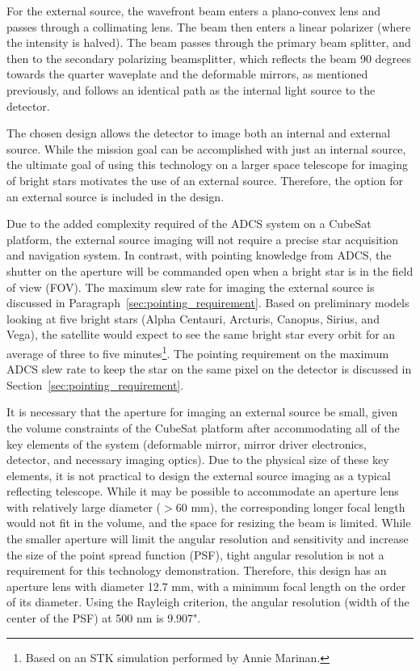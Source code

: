 \documentclass[12pt]{article}
\begin{document}
For the external source, the wavefront beam enters a plano-convex lens and passes through a collimating lens. The beam then enters a linear polarizer (where the intensity is halved). The beam passes through the primary beam splitter, and then to the secondary polarizing beamsplitter, which reflects the beam 90 degrees towards the quarter waveplate and the deformable mirrors, as mentioned previously, and follows an identical path as the internal light source to the detector.

The chosen design allows the detector to image both an internal and external source. While the mission goal can be accomplished with just an internal source, the ultimate goal of using this technology on a larger space telescope for imaging of bright stars motivates the use of an external source. Therefore, the option for an external source is included in the design.

Due to the added complexity required of the ADCS system on a CubeSat platform, the external source imaging will not require a precise star acquisition and navigation system. In contrast, with pointing knowledge from ADCS, the shutter on the aperture will be commanded open when a bright star is in the field of view (FOV). The maximum slew rate for imaging the external source is discussed in Paragraph~\ref{sec:pointing_requirement}.  Based on preliminary models looking at five bright stars (Alpha Centauri, Arcturis, Canopus, Sirius, and Vega), the satellite would expect to see the same bright star every orbit for an average of three to five minutes\footnote{Based on an STK simulation performed by Annie Marinan.}.  The pointing requirement on the maximum ADCS slew rate to keep the star on the same pixel on the detector is discussed in Section~\ref{sec:pointing_requirement}.

It is necessary that the aperture for imaging an external source be small, given the volume constraints of the CubeSat platform after accommodating all of the key elements of the system (deformable mirror, mirror driver electronics, detector, and necessary imaging optics). Due to the physical size of these key elements, it is not practical to design the external source imaging as a typical reflecting telescope. While it may be possible to accommodate an aperture lens with relatively large diameter ($>60$ mm), the corresponding longer focal length would not fit in the volume, and the space for resizing the beam is limited. While the smaller aperture will limit the angular resolution and sensitivity and increase the size of the point spread function (PSF), tight angular resolution is not a requirement for this technology demonstration. Therefore, this design has an aperture lens with diameter 12.7 mm, with a minimum focal length on the order of its diameter. Using the Rayleigh criterion, the angular resolution (width of the center of the PSF) at 500 nm is 9.907".
\end{document}
